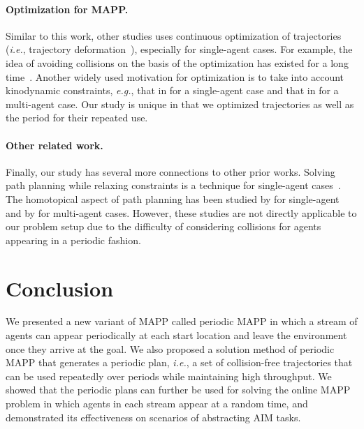 \documentclass[letterpaper]{article} %
\def\eg{{\it e.g.}}
\def\ie{{\it i.e.}}
\begin{document}
\paragraph{Optimization for MAPP.}
Similar to this work, other studies uses continuous optimization of trajectories (\ie, trajectory deformation~\cite{kurniawati2007path}), especially for single-agent cases. For example, the idea of avoiding collisions on the basis of the optimization has existed for a long time~\cite{khatib1986real}. Another widely used motivation for optimization is to take into account kinodynamic constraints, \eg, that in \citet{rosmann2017kinodynamic} for a single-agent case and that in \citet{honig2018trajectory} for a multi-agent case. Our study is unique in that we optimized trajectories as well as the period for their repeated use.




\paragraph{Other related work.}
Finally, our study has several more connections to other prior works. Solving path planning while relaxing constraints is a technique for single-agent cases~\cite{bonilla2015sample,bonilla2017noninteracting,fusco2018improving}.
The homotopical aspect of path planning has been studied by \citet{bhattacharya2010search} for single-agent and by \citet{bhattacharya2018path} for multi-agent cases. However, these studies are not directly applicable to our problem setup due to the difficulty of considering collisions for agents appearing in a periodic fashion.

\section{Conclusion}
We presented a new variant of MAPP called periodic MAPP in which a stream of agents can appear periodically at each start location and leave the environment once they arrive at the goal. We also proposed a solution method of periodic MAPP that generates a periodic plan, \ie, a set of collision-free trajectories that can be used repeatedly over periods while maintaining high throughput. We showed that the periodic plans can further be used for solving the online MAPP problem in which agents in each stream appear at a random time, and demonstrated its effectiveness on scenarios of abstracting AIM tasks.
\end{document}
